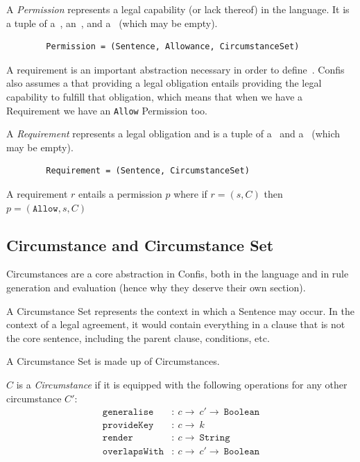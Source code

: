 \begin{definition}[Permission]
    \label{def:permission} A \emph{Permission} represents a legal capability (or lack thereof) in the language.
    It is a tuple of a~, an~, and a~ (which may be empty).
    \begin{verbatim}
        Permission = (Sentence, Allowance, CircumstanceSet)
    \end{verbatim}
\end{definition}

A requirement is an important abstraction necessary in order to define~.
Confis also assumes a that providing a legal obligation entails providing the legal capability to fulfill that obligation, which means that when we have a Requirement we have an \texttt{Allow} Permission too.

\begin{definition}[Requirement]
    \label{def:requirement} A \emph{Requirement} represents a legal obligation and is a tuple of a~ and a~ (which may be empty).
    \begin{verbatim}
        Requirement = (Sentence, CircumstanceSet)
    \end{verbatim}

    A requirement $r$ entails a permission $p$ where if $r = (s, C)$ then $p = (\texttt{Allow}, s, C)$
\end{definition}

\subsection{Circumstance and Circumstance Set}\label{subsec:circumstance}

Circumstances are a core abstraction in Confis, both in the language and in rule generation and evaluation (hence why they deserve their own section).

A Circumstance Set represents the context in which a Sentence may occur.
In the context of a legal agreement, it would contain everything in a clause that is not the core sentence, including the parent clause, conditions, etc.

A Circumstance Set is made up of Circumstances.


\begin{definition}[Circumstance]
    \label{def:circumstance}
    $C$ is a \emph{Circumstance} if it is equipped with the following operations for any other circumstance $C'$:
    \begin{align}
        \label{def:c:generalise}
        \texttt{generalise}&: \ c \to\ c' \to\ \texttt{Boolean}\\
        \label{def:c:provideKey}
        \texttt{provideKey}&: \ c \to\ k\\
        \label{def:c:render}
        \texttt{render}&: \ c \to\ \texttt{String}\\
        \label{def:c:overlap}
        \texttt{overlapsWith}&:\ c \to\ c' \to\ \texttt{Boolean}
    \end{align}
\end{definition}

